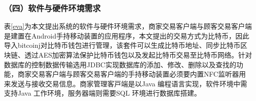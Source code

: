 	\subsubsection{（四）软件与硬件环境需求}
	表\ref{eva}为本文提出系统的软件与硬件环境需求，商家交易客户端与顾客交易客户端是建置在Android手持移动装置的应用程序，本文提出的交易方式为比特币，因此导入bitcoinj\supercite{Bitcoinclients}对比特币钱包进行管理，该套件可以生成比特币地址、同步比特币区块链、透过AES加密算法保护比特币钱包以及发起比特币交易至比特币网络。针对数据库的控制数据传输选用JDBC\supercite{JDBCdatabaseaccesswithJava:atutorialandannotatedreference}实现数据库的添加、修改、删除以及查找的功能，商家交易客户端与顾客交易客户端的手持移动装置必须要内置NFC监听器用来发送与接收交易信息。商家管理客⼾端是以Java 编程语⾔实现，软件环境中需⽀持Java ⼯作环境，服务器端则需要SQL 环境进行数据库搭建。



